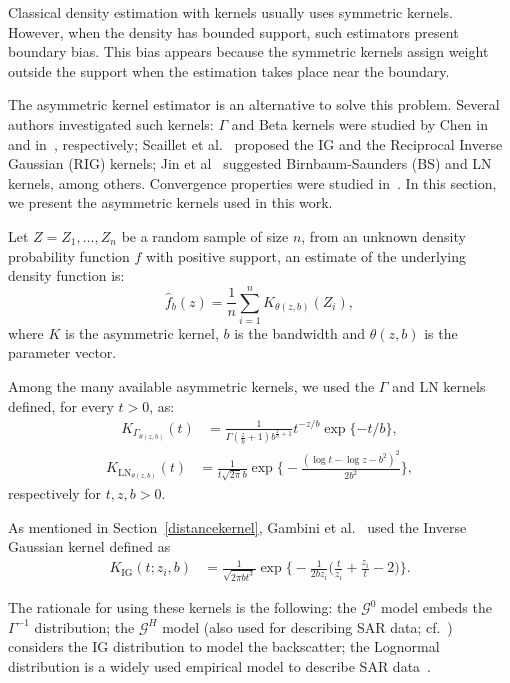 \documentclass[twocolumn]{svjour3}
\begin{document}
	Classical density estimation with kernels usually uses symmetric kernels. 
	However, when the density has bounded support, such estimators present boundary bias. 
	This bias appears because the symmetric kernels assign weight outside the support when the estimation takes place near the boundary.
	
	The asymmetric kernel estimator is an alternative to solve this problem. Several authors investigated such kernels: 
	$\Gamma$ and Beta kernels were studied by Chen in~\cite{chensx2000} and in~\cite{chen1999}, respectively; 
	Scaillet et al.~\cite{Scaillet2004} proposed the IG and the Reciprocal Inverse Gaussian (RIG) kernels; 
	Jin et al~\cite{Jin2003} suggested Birnbaum-Saunders (BS) and LN kernels, among others. 
	Convergence properties were studied in~\cite{bouezmarni2005,libengue2013}. In this section, we present the asymmetric kernels used in this work.
	
	Let $ Z = Z_1,\dots, Z_n$ be a random sample of size $n$, from an unknown density probability function $f$ with positive support, an estimate of the underlying density function is:
	$$
	\widehat{f}_b(z)=\frac{1}{n}\sum_{i=1}^n K_{\theta(z,b)}(Z_i),
	$$ 
	where $K$ is the asymmetric kernel, $b$ is the bandwidth and ${\theta}(z,b)$ is the parameter vector.
	
	Among the many available asymmetric kernels, we used the $\Gamma$ and LN kernels defined, for every $t>0$, as:
	\begin{align}
	K_{{\Gamma}_{{\theta}(z,b)}}(t) & =\frac{1}{\Gamma(\frac{z}{b}+1)b^{\frac{z}{b}+1}} t^{-{z}/{b}} \exp\{-{t}/{b}\},
	\label{gammakernel}
	\end{align}
	\begin{align}
	K_{{\text{{LN}}}_{{\theta}(z,b)}}(t) & =\frac{1}{t \sqrt{2 \pi} b} \exp\Big\{-\frac{\left(\log t - \log z -b^2\right)^2}{2b^2}\Big\},
	\label{LNkernel}
	\end{align}
	respectively for $t,z,b>0$.
	
	As mentioned in Section~\ref{distancekernel}, Gambini et al.~\cite{gambini2015} used the Inverse Gaussian kernel defined as
	\begin{align}
	K_{\text{IG}}( t; z_i,b) & =\frac{1}{\sqrt{2\pi b t^3}} 
	\exp\Big\{-\frac{1}{2b z_i} \Big(\frac{t}{z_i}+\frac{z_i}{t}-2\Big)\Big\}.
	\end{align}
	
	The rationale for using these kernels is the following:
	the $\mathcal{G}^0$ model embeds the $\Gamma^{-1}$ distribution;
	the $\mathcal{G}^H$ model (also used for describing SAR data; cf.~\cite{PolarimetricSegmentationBSplinesMSSP}) considers the IG distribution to model the backscatter;
	the Lognormal distribution is a widely used empirical model to describe SAR data~\cite{Gao2010}. 
	
\end{document}
